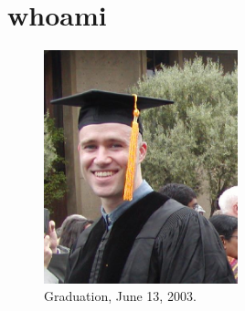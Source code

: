 \raggedbottom
\chapter{whoami}
\flushbottom

\begin{figure}[h!]
  \begin{center}
    \includegraphics[width=0.5\textwidth]{appendix/graduation}
  \end{center}
  \caption{Graduation, June 13, 2003.}
  \label{figure graduation}
\end{figure}

\raggedbottom
